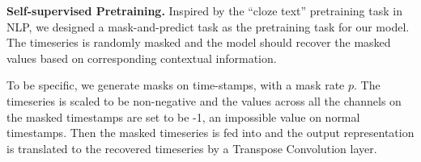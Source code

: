 \begin{sloppypar}
\noindent\textbf{Self-supervised Pretraining.}
Inspired by the ``cloze text'' pretraining task in NLP, we designed a mask-and-predict task as the pretraining task for our model. The timeseries is randomly masked and the model should recover the masked values based on corresponding contextual information.

To be specific, we generate masks on time-stamps, with a mask rate $p$. The timeseries is scaled to be non-negative and the values across all the channels on the masked timestamps are set to be -1, an impossible value on normal timestamps. Then the masked timeseries is fed into \system and the output representation is translated to the recovered timeseries by a Transpose Convolution layer.

\begin{comment}
\subsection{Downstream Tasks}
\label{sec.transformer.downstream}

\system supports a variety of downstream tasks, as shown in Fig.~\ref{fig.overview}. In this section, we show that with minimal modification \system can effectively support classification, imputation and forecasting tasks. 
Other unsupervised tasks such as similarity search or clustering are naturally supported by extracting feature embeddings from \system.

\subsubsection{Classification\nopunct}\ \\ 
To classify timeseries, we input timeseries to the model as described in Sec.~\ref{sec.rita.encoder}, and feed the output representation of \textbf{[CLS]} into a classifier: $\mathit{y=Softmax(W_{cls}Z_{[CLS]}+B_{cls})}$, where $Z_{[CLS]}\in \mathbb{R}^d$ is the output representation of \textbf{[CLS]}, C is the number of classes, and $\mathit{W_{cls} \in \mathbb{R}^{C \times d}, B_{cls} \in \mathbb{R}^{C}}$ are learnable parameters for classification task. 
The result vector $y\in \mathbb{R}^{C}$ represents the possibility that the input timeseries belongs to each class.

We apply Cross Entropy Loss as the loss function of the classification task~\cite{cox1958regression}:
$\mathit{L=\frac{1}{C}\sum_{i=1}^C -\hat{y}(i)log(y(i))}$, where $\hat{y}$ is a binary indicator for ground truth label:
\vspace{-1mm}
\begin{eqnarray}
\hat{y}(i) =
\begin{cases}
1   & i\  \text{is ground truth label} \\
0   & otherwise
\end{cases}
\end{eqnarray}


\end{comment}
\end{sloppypar}
